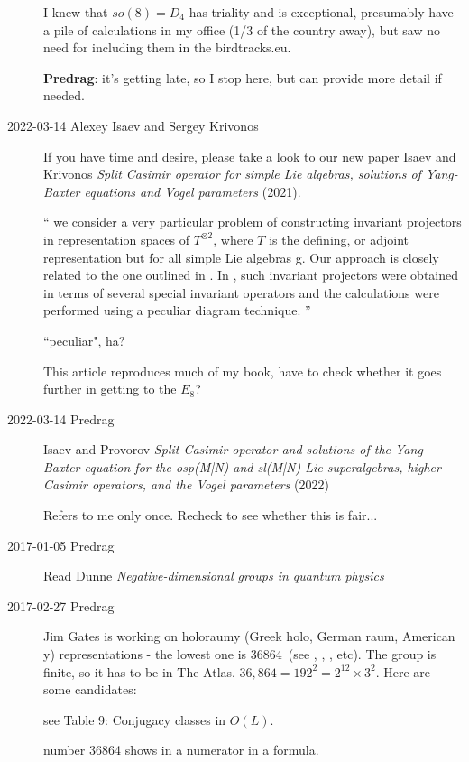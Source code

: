 \begin{description}
I knew that $so(8)=D_4$ has triality and is exceptional, presumably have
a pile of calculations in my office (1/3 of the country away), but saw no
need for including them in the birdtracks.eu.

{\bf Predrag}: it's getting late, so I stop here, but can provide more
detail if needed.

\item[2022-03-14 Alexey Isaev and Sergey Krivonos]
If you have time and desire, please take a look to our new paper
Isaev and Krivonos
{\em Split Casimir operator for simple Lie algebras, solutions of {Yang-Baxter} equations and {Vogel} parameters}
(2021).

``
we consider a very particular problem of constructing invariant
projectors in representation spaces of $T^{\otimes2}$, where $T$ is the
defining, or adjoint representation but for all simple Lie algebras g.
Our approach is closely related to the one outlined in . In
, such invariant projectors were obtained in terms of
several special invariant operators and the calculations were performed
using a peculiar diagram technique.
''

``peculiar", ha?

This article reproduces much of my book, have to check whether it goes further
in getting to the $E_8$?


\item[2022-03-14 Predrag]
Isaev and Provorov
{\em Split {Casimir} operator and solutions of the {Yang-Baxter} equation
for the {osp(M|N) and sl(M|N) Lie} superalgebras, higher {Casimir}
operators, and the {Vogel} parameters}
(2022)

Refers to me only once. Recheck to see whether this is fair...


\item[2017-01-05 Predrag]
Read Dunne
{\em Negative-dimensional groups in quantum physics}

\item[2017-02-27 Predrag]
Jim Gates is working on holoraumy (Greek holo, German raum, American y)
representations - the lowest one is 36864\dmn\ (see ,
, , etc). The group is finite, so it
has to be in The Atlas. $36,864=192^2=2^{12}\times3^2$.
Here are some candidates:

 see Table 9: Conjugacy classes in $O(L)$.

  number 36864 shows in a numerator in a formula.


\end{description}
